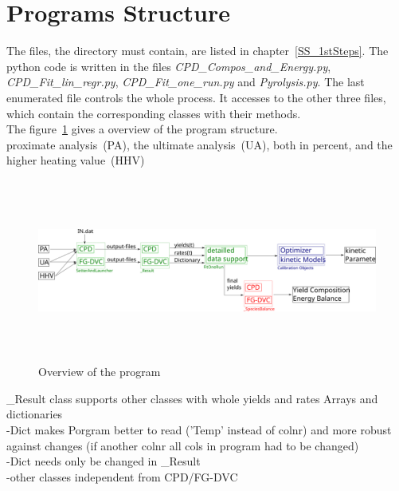 \section{Programs Structure}\label{S_Program}
The files, the directory must contain, are listed in chapter~\ref{SS_1stSteps}. The python code is written in the files  \emph{CPD\_Compos\_and\_Energy.py}, \emph{CPD\_Fit\_lin\_regr.py}, \emph{CPD\_Fit\_one\_run.py} and \emph{Pyrolysis.py}. The last enumerated file controls the whole process. It accesses to the other three files, which contain the corresponding classes with their methods.\\
The figure~\ref{F_Structure} gives a overview of the program structure.\\

proximate analysis~(PA), the ultimate analysis~(UA), both in percent, and the higher heating value~(HHV)

\begin{figure}
\centering%
\includegraphics[height=6cm,angle=90]{Figures/Programstructure}
\caption{Overview of the program}
\label{F_Structure}
\end{figure}

\_Result class supports other classes with whole yields and rates Arrays and dictionaries\\
-Dict makes Porgram better to read ('Temp' instead of colnr) and more robust against changes (if another colnr all cols in program had to be changed)\\
-Dict needs only be changed in \_Result\\
-other classes independent from CPD/FG-DVC\\